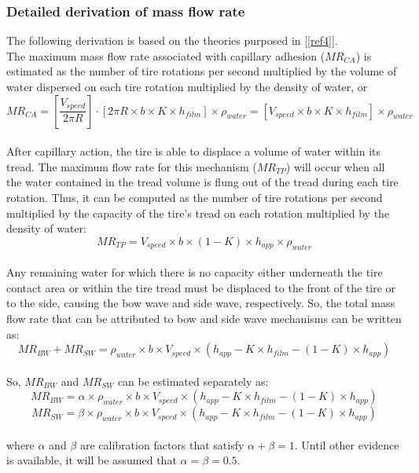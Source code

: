 \documentclass[12pt]{article}
\newcommand{\reref}[1]{\ref{#1}}
\begin{document}
\subsubsection*{Detailed derivation of mass flow rate}

The following derivation is based on the theories purposed in [\reref{ref4}].\\
The maximum mass flow rate associated with capillary adhesion ($\mathit{MR_{CA}}$) is estimated as the number of tire rotations per second multiplied by the volume of water dispersed on each tire rotation multiplied by the density of water, or
 \[ 
\mathit{MR_{CA}} = \left[\frac{V_{speed}}{2\pi R}\right] \cdot \left[ 2\pi R \times b \times K \times h_{film} \right] \times \rho_{water} = \left[V_{speed} \times b \times K \times h_{film} \right] \times  \rho_{water} 
\]
\\
After capillary action, the tire is able to displace a volume of water within its tread. The maximum flow rate for this mechanism ($\mathit{MR_{TP}}$) will occur when all the water contained in the tread volume is flung out of the tread during each tire rotation. Thus, it can be computed as the number of tire rotations per second multiplied by the capacity of the tire’s tread on each rotation multiplied by the density of water:
 \[ 
\mathit{MR_{TP}} = V_{speed} \times b \times (1-K) \times h_{app} \times \rho_{water} 
\]
\\
Any remaining water for which there is no capacity either underneath the tire contact area or within the tire tread must be displaced to the front of the tire or to the side, causing the bow wave and side wave, respectively. So, the total mass flow rate that can be attributed to bow and side wave mechanisms can be written as:
 \[ 
\mathit{MR_{BW} + MR_{SW}} =  \rho_{water} \times b \times V_{speed} \times (h_{app} - K \times h_{film} - (1-K) \times h_{app}) \]
\\
So, $\mathit{MR_{BW}}$ and $\mathit{MR_{SW}}$ can be estimated separately as:
 \[ 
\mathit{MR_{BW}} =  \alpha \times \rho_{water} \times b \times V_{speed} \times (h_{app} - K \times h_{film} - (1-K) \times h_{app}) \]
 \[
\mathit{MR_{SW}} = \beta \times \rho_{water} \times b \times V_{speed} \times (h_{app} - K \times h_{film} - (1-K) \times h_{app}) \]
\\
where $\alpha$ and $\beta$ are calibration factors that satisfy $\alpha + \beta = 1$. Until other evidence is available, it will be assumed that $\alpha = \beta = 0.5$.


\newpage
\end{document}
